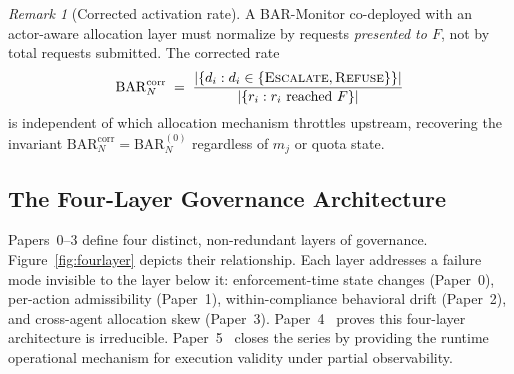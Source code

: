 \documentclass[11pt]{article}
\theoremstyle{plain}
\theoremstyle{definition}
\theoremstyle{remark}
\newtheorem{remark}[theorem]{Remark}
\newcommand{\Refuse}{\textsc{Refuse}}
\newcommand{\Escalate}{\textsc{Escalate}}
\begin{document}
\begin{remark}[Corrected activation rate]
\label{rem:bar-correction}
A BAR-Monitor co-deployed with an actor-aware allocation layer must
normalize by requests \emph{presented to $F$}, not by total requests
submitted.  The corrected rate
\[
  \mathrm{BAR}_N^{\mathrm{corr}}
  \;=\;
  \frac{|\{d_i : d_i \in \{\Escalate, \Refuse\}\}|}
       {|\{r_i : r_i\text{ reached }F\}|}
\]
is independent of which allocation mechanism throttles upstream,
recovering the invariant $\mathrm{BAR}_N^{\mathrm{corr}} =
\mathrm{BAR}_N^{(0)}$ regardless of $m_j$ or quota state.
\end{remark}

\subsection{The Four-Layer Governance Architecture}
\label{sec:four-layers}

Papers~0--3 define four distinct, non-redundant layers of governance.
Figure~\ref{fig:fourlayer} depicts their relationship.  Each layer
addresses a failure mode invisible to the layer below it:
enforcement-time state changes (Paper~0), per-action admissibility
(Paper~1), within-compliance behavioral drift (Paper~2), and
cross-agent allocation skew (Paper~3).
Paper~4~\citep{fernandez2026comp} proves this four-layer architecture
is irreducible.  Paper~5~\citep{fernandez2026ram} closes the series by
providing the runtime operational mechanism for execution validity under
partial observability.
\end{document}
